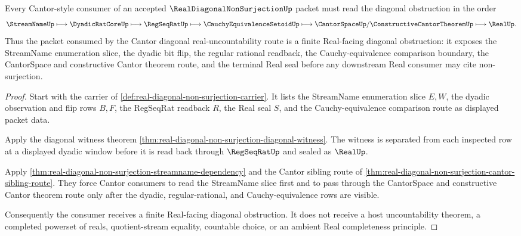 \begin{theorem}
\label{thm:real-diagonal-non-surjection-cantor-regseqrat-dependency}
Every Cantor-style consumer of an accepted $\RealDiagonalNonSurjectionUp$ packet must read the diagonal obstruction in the order
$$
\StreamNameUp \longmapsto \DyadicRatCoreUp \longmapsto \RegSeqRatUp \longmapsto \CauchyEquivalenceSetoidUp \longmapsto \CantorSpaceUp/\ConstructiveCantorTheoremUp \longmapsto \RealUp .
$$
Thus the packet consumed by the Cantor diagonal real-uncountability route is a finite Real-facing diagonal obstruction: it exposes the StreamName enumeration slice, the dyadic bit flip, the regular rational readback, the Cauchy-equivalence comparison boundary, the CantorSpace and constructive Cantor theorem route, and the terminal Real seal before any downstream Real consumer may cite non-surjection.
\end{theorem}
\begin{proof}
Start with the carrier of \autoref{def:real-diagonal-non-surjection-carrier}. It lists the StreamName enumeration slice $E,W$, the dyadic observation and flip rows $B,F$, the RegSeqRat readback $R$, the Real seal $S$, and the Cauchy-equivalence comparison route as displayed packet data.

Apply the diagonal witness theorem \autoref{thm:real-diagonal-non-surjection-diagonal-witness}. The witness is separated from each inspected row at a displayed dyadic window before it is read back through $\RegSeqRatUp$ and sealed as $\RealUp$.

Apply \autoref{thm:real-diagonal-non-surjection-streamname-dependency} and the Cantor sibling route of \autoref{thm:real-diagonal-non-surjection-cantor-sibling-route}. They force Cantor consumers to read the StreamName slice first and to pass through the CantorSpace and constructive Cantor theorem route only after the dyadic, regular-rational, and Cauchy-equivalence rows are visible.

Consequently the consumer receives a finite Real-facing diagonal obstruction. It does not receive a host uncountability theorem, a completed powerset of reals, quotient-stream equality, countable choice, or an ambient Real completeness principle.
\end{proof}


